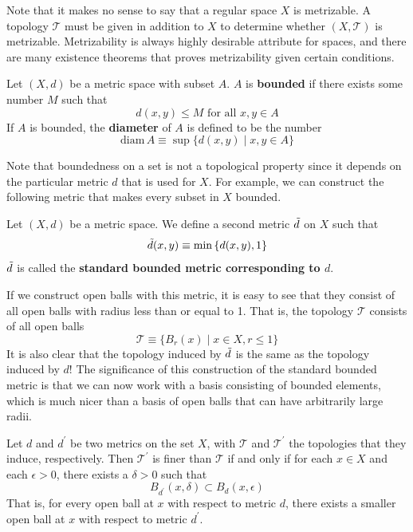 \documentclass{article}
\begin{document}
  Note that it makes no sense to say that a regular space $X$ is metrizable. A topology $\mathscr{T}$ must be given in addition to $X$ to determine whether $(X, \mathscr{T})$ is metrizable. Metrizability is always highly desirable attribute for spaces, and there are many existence theorems that proves metrizability given certain conditions. 

  \begin{definition}
  Let $(X, d)$ be a metric space with subset $A$. $A$ is \textbf{bounded} if there exists some number $M$ such that
  \[d (x, y) \leq M \text{ for all } x,y \in A\]
  If $A$ is bounded, the \textbf{diameter} of $A$ is defined to be the number
  \[\text{diam}\, A \equiv \sup{\{d(x, y) \; | \; x, y \in A\}}\]
  \end{definition}

  Note that boundedness on a set is not a topological property since it depends on the particular metric $d$ that is used for $X$. For example, we can construct the following metric that makes every subset in $X$ bounded. 

  \begin{definition}
  Let $(X, d)$ be a metric space. We define a second metric $\Tilde{d}$ on $X$ such that
  \[\Tilde{d} (x, y) \equiv \min{\{d(x, y), 1\}}\]
  $\Tilde{d}$ is called the \textbf{standard bounded metric corresponding to $d$}. 
  \end{definition}

  If we construct open balls with this metric, it is easy to see that they consist of all open balls with radius less than or equal to 1. That is, the topology $\mathscr{T}$ consists of all open balls
  \[\mathscr{T} \equiv \{B_r (x) \; | \; x \in X, r \leq 1\}\]
  It is also clear that the topology induced by $\Tilde{d}$ is the same as the topology induced by $d$! The significance of this construction of the standard bounded metric is that we can now work with a basis consisting of bounded elements, which is much nicer than a basis of open balls that can have arbitrarily large radii.  

  \begin{lemma}
  Let $d$ and $d^\prime$ be two metrics on the set $X$, with $\mathscr{T}$ and $\mathscr{T}^\prime$ the topologies that they induce, respectively. Then $\mathscr{T}^\prime$ is finer than $\mathscr{T}$ if and only if for each $x \in X$ and each $\epsilon > 0$, there exists a $\delta > 0$ such that
  \[B_{d^\prime} (x, \delta) \subset B_d (x, \epsilon)\]
  That is, for every open ball at $x$ with respect to metric $d$, there exists a smaller open ball at $x$ with respect to metric $d^\prime$. 
  \end{lemma}
\end{document}
